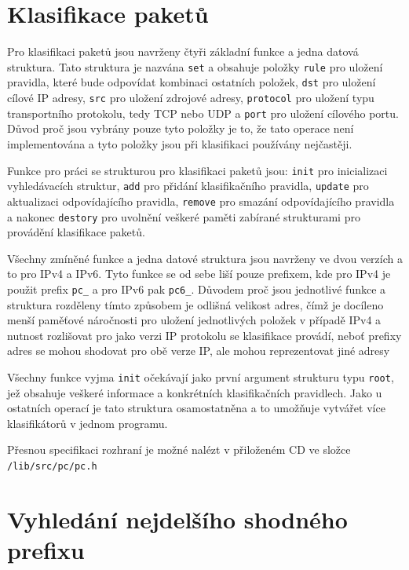 \section{Klasifikace paketů}\label{api:pc} %

Pro klasifikaci paketů jsou navrženy čtyři základní funkce a jedna datová struktura.
Tato struktura je nazvána \texttt{set} a obsahuje položky \texttt{rule} pro uložení pravidla,
které bude odpovídat kombinaci ostatních položek, \texttt{dst} pro uložení cílové IP adresy,
\texttt{src} pro uložení zdrojové adresy, \texttt{protocol} pro uložení typu transportního protokolu,
tedy TCP nebo UDP a \texttt{port} pro uložení cílového portu.
Důvod proč jsou vybrány pouze tyto položky je to, že tato operace není implementována
a tyto položky jsou při klasifikaci používány nejčastěji.

Funkce pro práci se strukturou pro klasifikaci paketů jsou: \texttt{init} pro inicializaci
vyhledávacích struktur, \texttt{add} pro přidání klasifikačního pravidla, \texttt{update}
pro aktualizaci odpovídajícího pravidla, \texttt{remove} pro smazání odpovídajícího pravidla
a nakonec \texttt{destory} pro uvolnění veškeré paměti zabírané strukturami pro provádění klasifikace
paketů.

Všechny zmíněné funkce a jedna datové struktura jsou navrženy ve dvou verzích a to pro IPv4 a IPv6.
Tyto funkce se od sebe liší pouze prefixem, kde pro IPv4 je použit prefix \texttt{pc\_} a pro
IPv6 pak \texttt{pc6\_}. Důvodem proč jsou jednotlivé funkce a struktura rozděleny tímto
způsobem je odlišná velikost adres, čímž je docíleno menší paměťové náročnosti pro uložení jednotlivých položek
v případě IPv4 a nutnost rozlišovat pro jako verzi IP protokolu se klasifikace provádí,
neboť prefixy adres se mohou shodovat pro obě verze IP, ale mohou reprezentovat jiné adresy

Všechny funkce vyjma \texttt{init} očekávají jako první argument strukturu typu \texttt{root},
jež obsahuje veškeré informace a konkrétních klasifikačních pravidlech. Jako u ostatních operací
je tato struktura osamostatněna a to umožňuje vytvářet více klasifikátorů v jednom programu.

Přesnou specifikaci rozhraní je možné nalézt v přiloženém CD ve složce \texttt{/lib/src/pc/pc.h}

\section{Vyhledání nejdelšího shodného prefixu}\label{api:lpm} %

